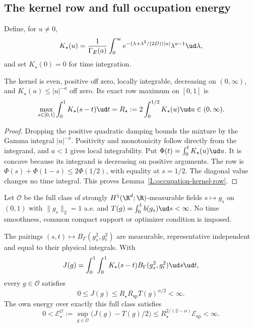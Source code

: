 \subsection{The kernel row and full occupation energy}

Define, for $u\ne0$,
\begin{equation}\label{E:occupation-damped-kernel}
  K_\star(u)=\frac1{\Gamma_E(a)}
  \int_0^\infty
  e^{-(\lambda+\lambda^2/(2D))|u|}
  \lambda^{a-1}\ud\lambda,
\end{equation}
and set $K_\star(0)=0$ for time integration.

\begin{lemma}\label{L:occupation-kernel-row}
  The kernel is even, positive off zero, locally integrable,
  decreasing on $(0,\infty)$, and $K_\star(u)\le|u|^{-a}$ off zero.
  Its exact row maximum on $[0,1]$ is
  \begin{equation}\label{E:occupation-kernel-row}
    \max_{s\in[0,1]}\int_0^1K_\star(s-t)\ud t
    =R_\star:=2\int_0^{1/2}K_\star(u)\ud u\in(0,\infty).
  \end{equation}
\end{lemma}

\begin{proof}
  Dropping the positive quadratic damping bounds the mixture by
  the Gamma integral $|u|^{-a}$.
  Positivity and monotonicity follow directly from the integrand,
  and $a<1$ gives local integrability.
  Put $\Phi(t)=\int_0^tK_\star(u)\ud u$. It is concave because
  its integrand is decreasing on positive arguments.
  The row is $\Phi(s)+\Phi(1-s)\le2\Phi(1/2)$, with equality
  at $s=1/2$. The diagonal value changes no time integral.
  This proves Lemma~\ref{L:occupation-kernel-row}.
\end{proof}

Let $\mathcal O$ be the full class of strongly $H^1(\R^d;\R)$-measurable
fields $s\mapsto g_s$ on $(0,1)$ with
$\|g_s\|_2=1$ a.e. and
$T(g)=\int_0^1b(g_s)\ud s<\infty$.
No time smoothness, common compact support or optimizer condition
is imposed.

\begin{proposition}
  \label{P:occupation-physical-class}
  The pairings $(s,t)\mapsto B_\Gamma(g_s^2,g_t^2)$ are measurable,
  representative independent and equal to their physical integrals.
  With
  \[
    J(g)=\int_0^1\int_0^1
    K_\star(s-t)B_\Gamma(g_s^2,g_t^2)\ud s\ud t,
  \]
  every $g\in\mathcal O$ satisfies
  \begin{equation}\label{E:occupation-physical-bound}
    0\le J(g)\le R_\star R_{\mathrm{sp}}T(g)^{\alpha/2}<\infty.
  \end{equation}
  The own energy over exactly this full class satisfies
  \begin{equation}\label{E:occupation-own-energy}
    0<\mathcal E_\star^{\mathcal O}
    :=\sup_{g\in\mathcal O}\big(J(g)-T(g)/2\big)
    \le R_\star^{2/(2-\alpha)}\mathcal E_{\mathrm{sp}}<\infty.
  \end{equation}
\end{proposition}


